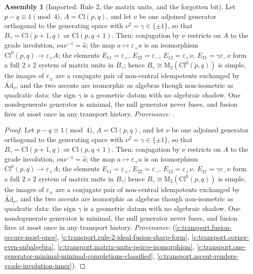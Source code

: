 \documentclass[11pt]{article}
\theoremstyle{definition}
\newtheorem{assembled}[theorem]{Assembly}
\theoremstyle{plain}
\providecommand{\Ad}{}\renewcommand{\Ad}{\widetilde{\mathrm{Ad}}}
\providecommand{\Cl}{}\renewcommand{\Cl}{\mathrm{Cl}}
\providecommand{\Mat}{}\renewcommand{\Mat}{\mathrm{M}}
\begin{document}
\begin{assembled}[Imported: Rule 2, the matrix units, and the forgotten bit]\label{c:rule2.imported-rule-2-matrix-units-forgotten}
Let $p - q \equiv 1 \pmod 4$, $A = \Cl(p,q)$, and let $\nu$ be one adjoined generator orthogonal to the generating space with $\nu^2 = \gamma \in \{\pm 1\}$, so that $B_\gamma = \Cl(p{+}1,q)$ or $\Cl(p,q{+}1)$. Then: conjugation by $\nu$ restricts on $A$ to the grade involution, $\nu a \nu^{-1} = \hat{a}$; the map $a \mapsto \varepsilon_+ a$ is an isomorphism $\Cl^0(p,q) \to \varepsilon_+ A$; the elements $E_{11} = \varepsilon_+$, $E_{22} = \varepsilon_-$, $E_{12} = \varepsilon_+\nu$, $E_{21} = \gamma\varepsilon_-\nu$ form a full $2 \times 2$ system of matrix units in $B_\gamma$; hence $B_\gamma \cong \Mat_2(\Cl^0(p,q))$ is simple, the images of $\varepsilon_\pm$ are a conjugate pair of non-central idempotents exchanged by $\Ad_\nu$, and the two ascents are isomorphic as algebras though non-isometric as quadratic data: the sign $\gamma$ is a geometric datum with no algebraic shadow. One nondegenerate generator is minimal, the null generator never fuses, and fusion fires at most once in any transport history. \emph{Provenance:} \cite[Prop.~5.2, Lemma 5.3, Lemma 5.4, Thm.~5.5, Thm.~5.7, Remark 5.8, Prop.~7.4]{ButlerT1}.
\end{assembled}
\begin{proof}
Let $p - q \equiv 1 \pmod 4$, $A = \Cl(p,q)$, and let $\nu$ be one adjoined generator orthogonal to the generating space with $\nu^2 = \gamma \in \{\pm 1\}$, so that $B_\gamma = \Cl(p{+}1,q)$ or $\Cl(p,q{+}1)$. Then: conjugation by $\nu$ restricts on $A$ to the grade involution, $\nu a \nu^{-1} = \hat{a}$; the map $a \mapsto \varepsilon_+ a$ is an isomorphism $\Cl^0(p,q) \to \varepsilon_+ A$; the elements $E_{11} = \varepsilon_+$, $E_{22} = \varepsilon_-$, $E_{12} = \varepsilon_+\nu$, $E_{21} = \gamma\varepsilon_-\nu$ form a full $2 \times 2$ system of matrix units in $B_\gamma$; hence $B_\gamma \cong \Mat_2(\Cl^0(p,q))$ is simple, the images of $\varepsilon_\pm$ are a conjugate pair of non-central idempotents exchanged by $\Ad_\nu$, and the two ascents are isomorphic as algebras though non-isometric as quadratic data: the sign $\gamma$ is a geometric datum with no algebraic shadow. One nondegenerate generator is minimal, the null generator never fuses, and fusion fires at most once in any transport history. \emph{Provenance:} \cite[Prop.~5.2, Lemma 5.3, Lemma 5.4, Thm.~5.5, Thm.~5.7, Remark 5.8, Prop.~7.4]{ButlerT1} (\ref{c:transport.fusion-occurs-most-once}, \ref{c:transport.rule-2-ideal-fusion-sharp-form}, \ref{c:transport.corner-even-subalgebra}, \ref{c:transport.matrix-units-peirce-isomorphism}, \ref{c:transport.one-generator-minimal-minimal-completions-classified}, \ref{c:transport.ascent-renders-grade-involution-inner}).

\end{proof}
\end{document}
